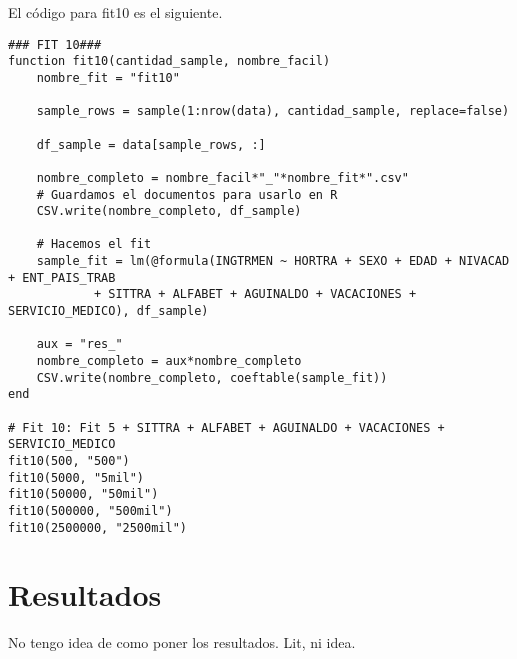 El código para \textsf{fit10} es el siguiente. 

\begin{verbatim}
### FIT 10###
function fit10(cantidad_sample, nombre_facil)
    nombre_fit = "fit10"
    
    sample_rows = sample(1:nrow(data), cantidad_sample, replace=false)

    df_sample = data[sample_rows, :]
    
    nombre_completo = nombre_facil*"_"*nombre_fit*".csv"
    # Guardamos el documentos para usarlo en R
    CSV.write(nombre_completo, df_sample)

    # Hacemos el fit
    sample_fit = lm(@formula(INGTRMEN ~ HORTRA + SEXO + EDAD + NIVACAD + ENT_PAIS_TRAB
            + SITTRA + ALFABET + AGUINALDO + VACACIONES + SERVICIO_MEDICO), df_sample)

    aux = "res_"
    nombre_completo = aux*nombre_completo
    CSV.write(nombre_completo, coeftable(sample_fit))
end 

# Fit 10: Fit 5 + SITTRA + ALFABET + AGUINALDO + VACACIONES + SERVICIO_MEDICO
fit10(500, "500")
fit10(5000, "5mil")
fit10(50000, "50mil")
fit10(500000, "500mil")
fit10(2500000, "2500mil")

\end{verbatim}

\section{Resultados}
No tengo idea de como poner los resultados. Lit, ni idea.

